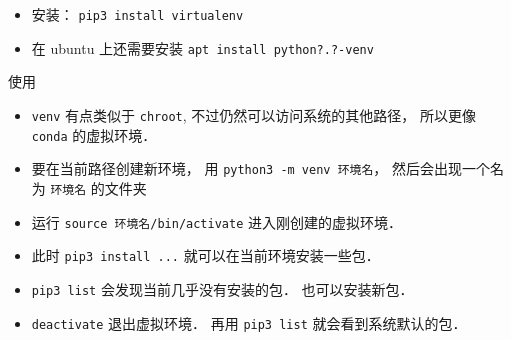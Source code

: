 
\begin{issues}
\issueDraft
\end{issues}

\begin{itemize}
\item 安装： \verb|pip3 install virtualenv|
\item 在 ubuntu 上还需要安装 \verb|apt install python?.?-venv|
\end{itemize}

使用
\begin{itemize}
\item \verb|venv| 有点类似于 \verb|chroot|, 不过仍然可以访问系统的其他路径， 所以更像 \verb|conda| 的虚拟环境．
\item 要在当前路径创建新环境， 用 \verb|python3 -m venv 环境名|， 然后会出现一个名为 \verb|环境名| 的文件夹
\item 运行 \verb|source 环境名/bin/activate| 进入刚创建的虚拟环境．
\item 此时 \verb|pip3 install ...| 就可以在当前环境安装一些包．
\item \verb|pip3 list| 会发现当前几乎没有安装的包． 也可以安装新包．
\item \verb|deactivate| 退出虚拟环境． 再用 \verb|pip3 list| 就会看到系统默认的包．
\end{itemize}
